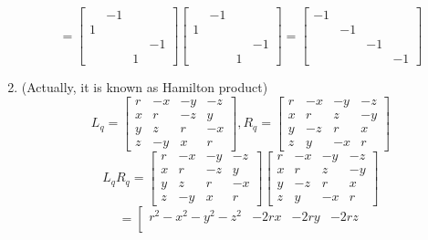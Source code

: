 \documentclass{article}
\begin{document}
\begin{enumerate}
    \[=
    \left[
    \begin{array}{cccc}
     & -1 \\
    1 & \\
    &&& -1 \\
    && 1
    \end{array}
    \right]
    \left[
    \begin{array}{cccc}
     & -1 \\
    1 & \\
    &&& -1 \\
    && 1
    \end{array}
    \right]
    =
    \left[
    \begin{array}{cccc}
    -1 \\ & -1 \\ & & -1 \\ & & & -1
    \end{array}
    \right]
    \]
    \item (Actually, it is known as Hamilton product)
    \[L_q = 
    \left[
    \begin{array}{cccc}
    r & -x & -y & -z \\
    x &  r & -z &  y \\
    y &  z &  r & -x \\
    z & -y &  x &  r
    \end{array}
    \right], R_q =
    \left[
    \begin{array}{cccc}
    r & -x & -y & -z \\
    x &  r &  z & -y \\
    y & -z &  r &  x \\
    z &  y & -x &  r
    \end{array}
    \right]
    \]
    \[L_qR_q=\left[
    \begin{array}{cccc}
    r & -x & -y & -z \\
    x &  r & -z &  y \\
    y &  z &  r & -x \\
    z & -y &  x &  r
    \end{array}
    \right]
    \left[
    \begin{array}{cccc}
    r & -x & -y & -z \\
    x &  r &  z & -y \\
    y & -z &  r &  x \\
    z &  y & -x &  r
    \end{array}
    \right]
    \]
    \[
    =
    \left[
    \begin{array}{cccc}
    r^2 - x^2 - y^2 - z^2 & -2rx & -2ry & -2rz \\

\end{array}\]
\end{enumerate}
\end{document}
